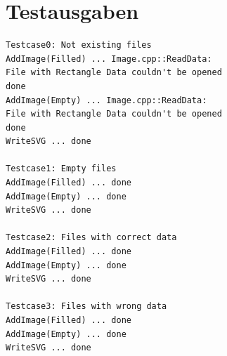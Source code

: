 \documentclass[12pt,a4paper]{article}
\begin{document}
\section {Testausgaben} 

\begin {verbatim}
Testcase0: Not existing files
AddImage(Filled) ... Image.cpp::ReadData: 
File with Rectangle Data couldn't be opened
done
AddImage(Empty) ... Image.cpp::ReadData: 
File with Rectangle Data couldn't be opened
done
WriteSVG ... done

Testcase1: Empty files
AddImage(Filled) ... done
AddImage(Empty) ... done
WriteSVG ... done

Testcase2: Files with correct data
AddImage(Filled) ... done
AddImage(Empty) ... done
WriteSVG ... done

Testcase3: Files with wrong data
AddImage(Filled) ... done
AddImage(Empty) ... done
WriteSVG ... done
\end {verbatim}
\end{document}
